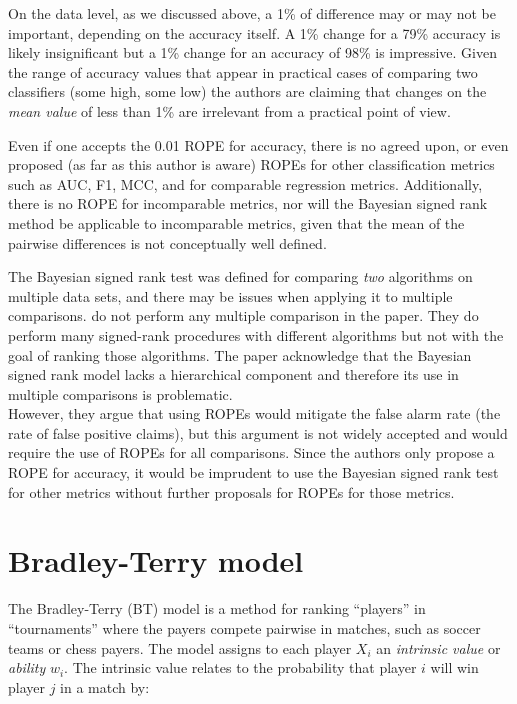 \documentclass[twoside,11pt,preprint]{article}
\begin{document}
On the data level, as we discussed above, a 1\% of difference may or
may not be important, depending on the accuracy itself. A 1\% change for a
79\% accuracy is likely insignificant but a 1\% change for an accuracy
of 98\% is impressive. Given the range of accuracy values that appear
in practical cases of comparing two classifiers (some high, some low)
the authors are claiming that changes on the \emph{mean value} of less than
1\% are irrelevant from a practical point of view.

Even if one accepts the 0.01 ROPE for accuracy, there is no agreed
upon, or even proposed (as far as this author is aware) ROPEs for other classification metrics such as AUC, F1, MCC, and for comparable
regression metrics. Additionally, there is no ROPE for
incomparable metrics, nor will the Bayesian signed rank method be
applicable to incomparable metrics, given that the mean of the
pairwise differences is not conceptually well defined.

The Bayesian signed rank test was defined for comparing \emph{two}
algorithms on multiple data sets, and there may be issues when applying it to multiple comparisons. \citet{benavoli2017time} do not perform
any multiple comparison in the paper. They do perform many
signed-rank procedures with different algorithms but not with the goal
of ranking those algorithms. The paper
acknowledge that the Bayesian signed rank model lacks a
hierarchical component and therefore its use in multiple comparisons is problematic.\\
However, they argue that using ROPEs would mitigate the false alarm rate (the rate of false positive claims), but this argument is not widely accepted and would require the use of ROPEs for all comparisons. Since the authors only propose a ROPE for accuracy, it would be imprudent to use the Bayesian signed rank test for other metrics without further proposals for ROPEs for those metrics.

\hypertarget{bradley-terry-model}{%
\section{\texorpdfstring{Bradley-Terry model \label{sec:btmod}}{Bradley-Terry model }}\label{bradley-terry-model}}

The Bradley-Terry (BT) model \citep{bradley1952rank} is a method for ranking
``players'' in ``tournaments'' where the payers compete pairwise in
matches, such as soccer teams or chess payers. The model
assigns to each player \(X_i\) an \emph{intrinsic value} or \emph{ability}
\(w_i\). The intrinsic value relates to the probability that player \(i\)
will win player \(j\) in a match by:
\end{document}
